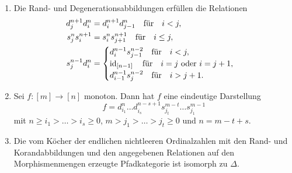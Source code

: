 \begin{lemma}[\cite{GM}, I.2, ex. 1] \label{face-gen}

  \begin{enumerate}[label=(\roman*)] \item \label{itm:face-gen-rel}
  Die Rand- und Degenerationsabbildungen er\-fül\-len die Relationen
  \begin{align*}
    d_j^{n+1} d_i^n &= d_i^{n+1} d_{j-1}^n \quad \text{für} \quad i < j, \\
    s_j^n s_i^{n+1} &= s_i^n s_{j+1}^{n+1} \quad \text{für} \quad i \leq j, \\
    s_j^{n-1} d_i^n &=
    \begin{cases}
    d_i^{n-1} s_{j-1}^{n-2} \quad \text{für} \quad i < j, \\
    \operatorname{id}_{[n-1]} \quad \text{für} \quad i = j \text{ oder } i = j+1, \\
    d_{i-1}^{n-1} s_j^{n-2} \quad \text{für} \quad i > j + 1.
    \end{cases}
  \end{align*}
 
  \item \label{itm:face-gen-form} Sei $f: [m] \to [n]$ monoton. Dann
  hat $f$ eine eindeutige Darstellung
  \[ f = d_{i_1}^n \dots d_{i_s}^{n-s+1} s_{j_t}^{m-t} \dots s_{j_1}^{m-1} \]
  mit $n \geq i_1 > \dots > i_s \geq 0$, $m > j_1 > \dots > j_t \geq
  0$ und $n = m-t+s$.
    
  \item \label{itm:face-gen-cat} Die vom Köcher der endlichen
  nichtleeren Ordinalzahlen mit den Rand- und Korandabbildungen und
  den angegebenen Relationen auf den Morphismenmengen erzeugte
  Pfadkategorie ist isomorph zu $\Delta$.
\end{enumerate}
\end{lemma}
